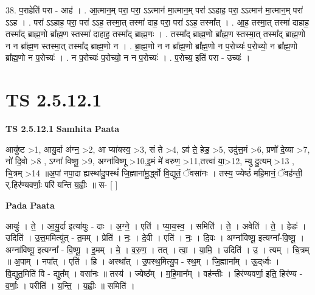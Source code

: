 \documentclass[17pt]{extarticle}
\begin{document}
38. प॒राहेति॑ परा - आह॑ । . आ॒त्मान॒म् परा॒ परा॒ ऽऽत्मान॑ मा॒त्मान॒म् परा॑ ऽऽहाह॒ परा॒ ऽऽत्मान॑ मा॒त्मान॒म् परा॑ ऽऽह । . परा॑ ऽऽहाह॒ परा॒ परा॑ ऽऽह॒ तस्मा॒त् तस्मा॑ दाह॒ परा॒ परा॑ ऽऽह॒ तस्मा᳚त् । . आ॒ह॒ तस्मा॒त् तस्मा॑ दाहाह॒ तस्मा᳚द् ब्राह्म॒णो ब्रा᳚ह्म॒ण स्तस्मा॑ दाहाह॒ तस्मा᳚द् ब्राह्म॒णः । . तस्मा᳚द् ब्राह्म॒णो ब्रा᳚ह्म॒ण स्तस्मा॒त् तस्मा᳚द् ब्राह्म॒णो न न ब्रा᳚ह्म॒ण स्तस्मा॒त् तस्मा᳚द् ब्राह्म॒णो न । . ब्रा॒ह्म॒णो न न ब्रा᳚ह्म॒णो ब्रा᳚ह्म॒णो न प॒रोच्यः॑ प॒रोच्यो॒ न ब्रा᳚ह्म॒णो ब्रा᳚ह्म॒णो न प॒रोच्यः॑ । . न प॒रोच्यः॑ प॒रोच्यो॒ न न प॒रोच्यः॑ । . प॒रोच्य॒ इति॑ परा - उच्यः॑ । \newline
\pagebreak
{}

\section{ TS 2.5.12.1 }

\textbf{TS 2.5.12.1 } \newline
\textbf{Samhita Paata} \newline

आयु॑ष्ट >1, आयु॒र्दा अ॑ग्न॒ >2, आ प्या॑यस्व॒ >3, सं ते >4, ऽव॑ ते॒ हेड॒ >5, उदु॑त्त॒मं >6, प्रणो॑ दे॒व्या >7, नो॑ दि॒वो >8 , ऽग्ना॑ विष्णू॒ >9, अग्ना॑विष्णू >10,इ॒मं मे॑ वरुण॒ >11,तत्त्वा॑ या॒>12, म्यु दु॒त्यम् >13 , चि॒त्रम् >14 ॥अ॒पां नपा॒दा ह्यस्था॑दु॒पस्थं॑ जि॒ह्माना॑मू॒र्द्ध्वो वि॒द्युतं॒ ॅवसा॑नः । तस्य॒ ज्येष्ठं॑ महि॒मानं॒ ॅवह॑न्ती॒ र्.हिर॑ण्यवर्णाः॒ परि॑ यन्ति य॒ह्वीः ॥ स-  [  ] \newline

\textbf{Pada Paata} \newline

आयुः॑ । ते॒ । आ॒यु॒र्दा इत्या॑युः - दाः । अ॒ग्ने॒ । एति॑ । प्या॒य॒स्व॒ । समिति॑ । ते॒ । अवेति॑ । ते॒ । हेडः॑ । उदिति॑ । उ॒त्त॒ममित्यु॑त् - त॒मम् । प्रेति॑ । नः॒ । दे॒वी । एति॑ । नः॒ । दि॒वः । अग्ना॑विष्णू॒ इत्यग्ना᳚-वि॒ष्णू॒ । अग्ना॑विष्णू॒ इत्यग्ना᳚ - वि॒ष्णू॒ । इ॒मम् । मे॒ । व॒रु॒ण॒ । तत् । त्वा॒ । या॒मि॒ । उदिति॑ । उ॒ । त्यम् । चि॒त्रम् ॥ अ॒पाम् । नपा᳚त् । एति॑ । हि । अस्था᳚त् । उ॒पस्थ॒मित्यु॒प - स्थ॒म् । जि॒ह्माना᳚म् । ऊ॒द्‌र्ध्वः । वि॒द्युत॒मिति॑ वि - द्युत᳚म् । वसा॑नः ॥ तस्य॑ । ज्येष्ठ᳚म् । म॒हि॒मान᳚म् । वह॑न्तीः । हिर॑ण्यवर्णा॒ इति॒ हिर॑ण्य - व॒र्णाः॒ । परीति॑ । य॒न्ति॒ । य॒ह्वीः ॥ समिति॑ ।  \newline
\end{document}
